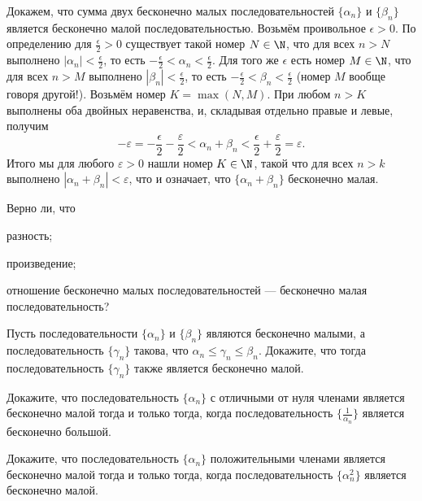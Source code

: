 \documentclass[a4paper, 12pt, num=2426, date=01.09.2020]{listok}
\begin{document}
\begin{example*}
    Докажем, что сумма двух бесконечно малых последовательностей $\{\alpha_n\}$ и $\{\beta_n\}$ является бесконечно малой последовательностью. Возьмём проивольное $\epsilon > 0$. По определению для $\frac\epsilon2 > 0$ существует такой номер $N \in \N$, что для всех $n > N$ выполнено $|\alpha_n| < \frac\epsilon2$, то есть $-\frac\epsilon2 < \alpha_n < \frac\epsilon2$. Для того же $\epsilon$ есть номер $M \in \N$, что для всех $n > M$ выполнено $|\beta_n| < \frac\epsilon2$, то есть $-\frac\epsilon2 < \beta_n < \frac\epsilon2$ (номер $M$ вообще говоря другой!). Возьмём номер $K = \max(N, M)$. При любом $n > K$ выполнены оба двойных неравенства, и, складывая отдельно правые и левые, получим \[-\varepsilon = -\frac\epsilon2 - \frac\varepsilon2 < \alpha_n + \beta_n < \frac\epsilon2 + \frac\varepsilon2 = \varepsilon.\]
    Итого мы для любого $\varepsilon > 0$ нашли номер $K \in \N$, такой что для всех $n > k$ выполнено $|\alpha_n + \beta_n| < \varepsilon$, что и означает, что $\{\alpha_n + \beta_n\}$ бесконечно малая.
\end{example*}

\begin{problem}
    Верно ли, что
    \begin{probparts}
        \item разность;
        \item произведение;
        \item отношение бесконечно малых последовательностей --- бесконечно малая последовательность?
    \end{probparts}
\end{problem}

\begin{problem}
    Пусть последовательности $\{\alpha_n\}$ и $\{\beta_n\}$ являются бесконечно малыми,
    а последовательность $\{\gamma_n\}$ такова, что $\alpha_n \le \gamma_n \le \beta_n$.
    Докажите, что тогда последовательность $\{\gamma_n\}$ также является бесконечно малой.
\end{problem}

\begin{problem}
    Докажите, что последовательность $\{\alpha_n\}$ с отличными от нуля членами является бесконечно малой тогда и только тогда, когда последовательность $\{\frac1{\alpha_n}\}$ является бесконечно большой.
\end{problem}

\begin{problem}
    Докажите, что последовательность $\{\alpha_n\}$ положительными членами является бесконечно малой тогда и только тогда,
    когда последовательность $\{\alpha_n^2\}$ является бесконечно малой.
\end{problem}
\end{document}
